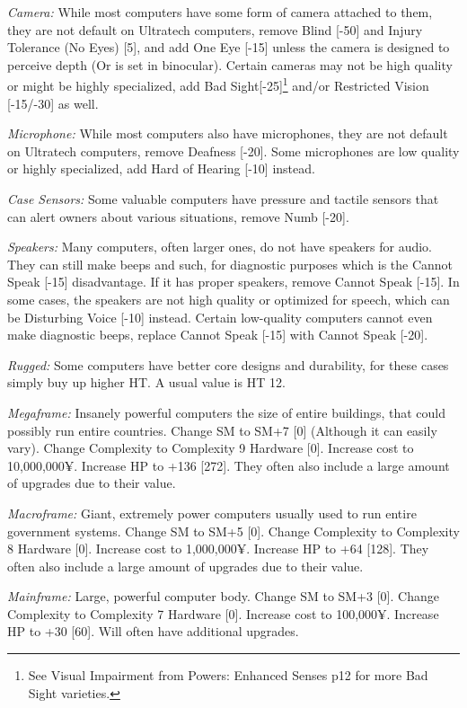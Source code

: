 \begin{multicols*}{3}
	\textit{Camera:} While most computers have some form of camera attached to them, they are not default on Ultratech computers, remove Blind [-50] and Injury Tolerance (No Eyes) [5], and add One Eye [-15] unless the camera is designed to perceive depth (Or is set in binocular). Certain cameras may not be high quality or might be highly specialized, add Bad Sight[-25]\footnote{See Visual Impairment from Powers: Enhanced Senses p12 for more Bad Sight varieties.} and/or Restricted Vision [-15/-30] as well.
	
	\textit{Microphone:} While most computers also have microphones, they are not default on Ultratech computers, remove Deafness [-20]. Some microphones are low quality or highly specialized, add Hard of Hearing [-10] instead.
	
	\textit{Case Sensors:} Some valuable computers have pressure and tactile sensors that can alert owners about various situations, remove Numb [-20].
	
	\textit{Speakers:} Many computers, often larger ones, do not have speakers for audio. They can still make beeps and such, for diagnostic purposes which is the Cannot Speak [-15] disadvantage. If it has proper speakers, remove Cannot Speak [-15]. In some cases, the speakers are not high quality or optimized for speech, which can be Disturbing Voice [-10] instead. Certain low-quality computers cannot even make diagnostic beeps, replace Cannot Speak [-15] with Cannot Speak [-20].
	
	\textit{Rugged:} Some computers have better core designs and durability, for these cases simply buy up higher HT. A usual value is HT 12.
	
	\textit{Megaframe:} Insanely powerful computers the size of entire buildings, that could possibly run entire countries. Change SM to SM+7 [0] (Although it can easily vary). Change Complexity to Complexity 9 Hardware [0]. Increase cost to 10,000,000¥. Increase HP to +136 [272]. They often also include a large amount of upgrades due to their value.
	
	\textit{Macroframe:} Giant, extremely power computers usually used to run entire government systems. Change SM to SM+5 [0]. Change Complexity to Complexity 8 Hardware [0]. Increase cost to 1,000,000¥. Increase HP to +64 [128]. They often also include a large amount of upgrades due to their value.
	
	\textit{Mainframe:} Large, powerful computer body. Change SM to SM+3 [0]. Change Complexity to Complexity 7 Hardware [0]. Increase cost to 100,000¥. Increase HP to +30 [60]. Will often have additional upgrades.
	

\end{multicols*}
